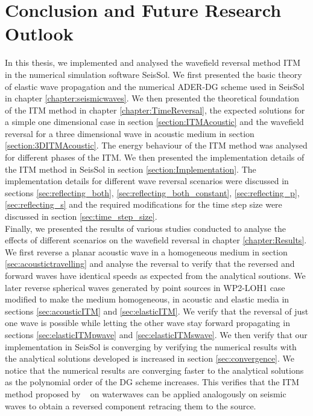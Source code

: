 \chapter{Conclusion and Future Research Outlook}\label{chapter:Conclusion}
In this thesis, we implemented and analysed the wavefield reversal method \ac{ITM} in the numerical simulation software SeisSol. We first presented the basic theory of elastic wave propagation and the numerical \ac{ADER}-\ac{DG} scheme used in SeisSol in chapter \ref{chapter:seismicwaves}.
We then presented the theoretical foundation of the \ac{ITM} method in chapter \ref{chapter:TimeReversal}, the expected solutions for a simple one dimensional case in section \ref{section:ITMAcoustic} and the wavefield reversal for a three dimensional wave in acoustic medium in section \ref{section:3DITMAcoustic}.
The energy behaviour of the \ac{ITM} method was analysed for different phases of the \ac{ITM}.
We then presented the implementation details of the \ac{ITM} method in SeisSol in section \ref{section:Implementation}. The implementation details 
for different wave reversal scenarios were discussed in sections \ref{sec:reflecting_both}, \ref{sec:reflecting_both_constant}, \ref{sec:reflecting_p}, \ref{sec:reflecting_s} and the required modifications for the time step size were discussed in section \ref{sec:time_step_size}. \\

Finally, we presented the results of various studies conducted to analyse the effects of different scenarios on the wavefield reversal in chapter \ref{chapter:Results}.
We first reverse a planar acoustic wave in a homogeneous medium in section \ref{sec:acoustictravelling} and analyse the reversal to verify that the reversed and forward waves have identical speeds as expected from the analytical soutions.
We later reverse spherical waves generated by point sources in WP2-LOH1 case modified to make the medium homogeneous, in acoustic and elastic media in sections \ref{sec:acousticITM} and \ref{sec:elasticITM}. We verify that the reversal of just one wave is possible while letting 
the other wave stay forward propagating in sections \ref{sec:elasticITMpwave} and \ref{sec:elasticITMswave}. We then verify that our implementation in SeisSol is converging by verifying the numerical results with the analytical solutions developed is increased in section \ref{sec:convergence}. We notice that
the numerical results are converging faster to the analytical solutions as the polynomial order of the \ac{DG} scheme increases. This verifies that the \ac{ITM}
method proposed by ~\parencite{Bacot2016} on waterwaves can be applied analogously on seismic waves to obtain a reversed component retracing them to the source. \\


